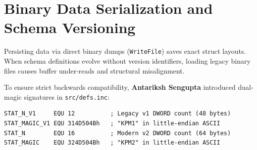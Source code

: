 \documentclass[11pt,a4paper]{article}
\begin{document}
\section{Binary Data Serialization and Schema Versioning}

Persisting data via direct binary dumps (\texttt{WriteFile}) saves exact struct layouts. When schema definitions evolve without version identifiers, loading legacy binary files causes buffer under-reads and structural misalignment.

To ensure strict backwards compatibility, \textbf{Antariksh Sengupta} introduced dual-magic signatures in \texttt{src/defs.inc}:
\begin{lstlisting}[language={[x86masm]Assembler}]
STAT_N_V1     EQU 12          ; Legacy v1 DWORD count (48 bytes)
STAT_MAGIC_V1 EQU 314D504Bh   ; "KPM1" in little-endian ASCII
STAT_N        EQU 16          ; Modern v2 DWORD count (64 bytes)
STAT_MAGIC    EQU 324D504Bh   ; "KPM2" in little-endian ASCII
\end{lstlisting}
\end{document}
